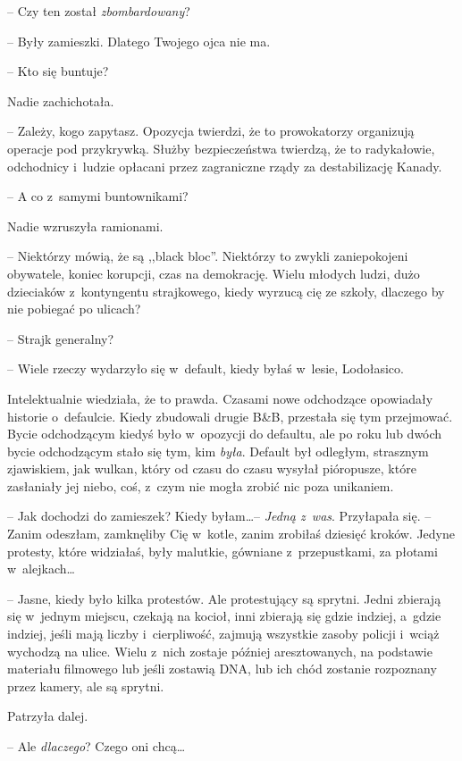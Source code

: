 \documentclass[oneside,polish,11pt,sfheadings]{mwbk}
\begin{document}
-- Czy ten został \textit{zbombardowany}?

-- Były zamieszki. Dlatego Twojego ojca nie ma.

-- Kto się buntuje?

Nadie zachichotała. 

-- Zależy, kogo zapytasz. Opozycja twierdzi, że to
prowokatorzy organizują operacje pod przykrywką. Służby bezpieczeństwa
twierdzą, że to radykałowie, odchodnicy i~ludzie opłacani przez
zagraniczne rządy za destabilizację Kanady.

-- A co z~samymi buntownikami?

Nadie wzruszyła ramionami. 

-- Niektórzy mówią, że są ,,black bloc''.
Niektórzy to zwykli zaniepokojeni obywatele, koniec korupcji, czas na
demokrację. Wielu młodych ludzi, dużo dzieciaków z~kontyngentu
strajkowego, kiedy wyrzucą cię ze szkoły, dlaczego by nie pobiegać po
ulicach?

-- Strajk generalny?

-- Wiele rzeczy wydarzyło się w~default, kiedy byłaś w~lesie, Lodołasico.

Intelektualnie wiedziała, że to prawda. Czasami nowe odchodzące
opowiadały historie o~defaulcie. Kiedy zbudowali drugie B\&B, przestała
się tym przejmować. Bycie odchodzącym kiedyś było w~opozycji do
defaultu, ale po roku lub dwóch bycie odchodzącym stało się tym, kim
\textit{była}. Default był odległym, strasznym zjawiskiem, jak wulkan,
który od czasu do czasu wysyłał pióropusze, które zasłaniały jej niebo,
coś, z~czym nie mogła zrobić nic poza unikaniem.

-- Jak dochodzi do zamieszek? Kiedy byłam\ldots  -- \textit{Jedną z~was}.
Przyłapała się. -- Zanim odeszłam, zamknęliby Cię w~kotle, zanim zrobiłaś
dziesięć kroków. Jedyne protesty, które widziałaś, były malutkie,
gówniane z~przepustkami, za płotami w~alejkach\ldots 

-- Jasne, kiedy było kilka protestów. Ale protestujący są sprytni. Jedni
zbierają się w~jednym miejscu, czekają na kocioł, inni zbierają się
gdzie indziej, a~gdzie indziej, jeśli mają liczby i~cierpliwość, zajmują
wszystkie zasoby policji i~wciąż wychodzą na ulice. Wielu z~nich zostaje
później aresztowanych, na podstawie materiału filmowego lub jeśli
zostawią DNA, lub ich chód zostanie rozpoznany przez kamery, ale są
sprytni.

Patrzyła dalej.

-- Ale \textit{dlaczego}? Czego oni chcą\ldots 
\end{document}
